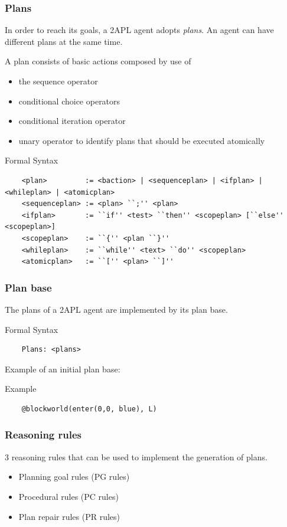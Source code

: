 \documentclass[dvipsnames,usenames,10pt]{beamer}
\newcommand{\bsyntax}{\begin{beamerboxesrounded}[upper=synupcol,lower=synlowcol,shadow=true]{Formal Syntax}}
\newcommand{\esyntax}{\end{beamerboxesrounded}}
\newcommand{\bexample}{\begin{beamerboxesrounded}[upper=exupcol,lower=exlowcol,shadow=true]{Example}}
\newcommand{\eexample}{\end{beamerboxesrounded}}
\begin{document}
\begin{frame}[fragile]
	\frametitle{Plans}
	
	In order to reach its goals, a 2APL agent adopts \emph{plans}.  An agent can have different plans at the same time.
	
	A plan consists of basic actions composed by use of
	\begin{itemize}
		\item the sequence operator
		\item conditional choice operators
		\item conditional iteration operator
		\item unary operator to identify plans that should be executed atomically
	\end{itemize}	
	
	\bsyntax
	\small
	\begin{verbatim}
	<plan>         := <baction> | <sequenceplan> | <ifplan> | <whileplan> | <atomicplan>
	<sequenceplan> := <plan> ``;'' <plan>
	<ifplan>       := ``if'' <test> ``then'' <scopeplan> [``else'' <scopeplan>]
	<scopeplan>    := ``{'' <plan ``}''
	<whileplan>    := ``while'' <text> ``do'' <scopeplan>
	<atomicplan>   := ``['' <plan> ``]''
	\end{verbatim}
	\esyntax
\end{frame}

\begin{frame}[fragile]
	\frametitle{Plan base}

	The plans of a 2APL agent are implemented by its plan base.

	\bsyntax
	\begin{verbatim}
	Plans: <plans>
	\end{verbatim}
	\esyntax

	Example of an initial plan base:
	\bexample
	\begin{verbatim}
	@blockworld(enter(0,0, blue), L)
	\end{verbatim}	
	\eexample
\end{frame}

\begin{frame}
	\frametitle{Reasoning rules}
	
	3 reasoning rules that can be used to implement the generation of plans.

	\begin{itemize}
		\item Planning goal rules (PG rules)
		\item Procedural rules (PC rules)
		\item Plan repair rules (PR rules)
	\end{itemize}
\end{frame}
\end{document}
